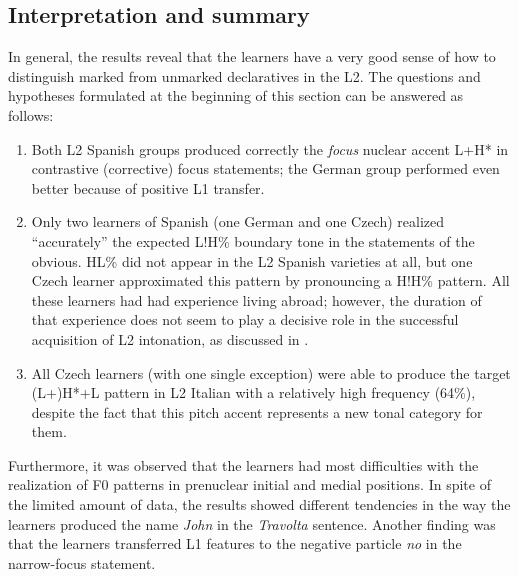 \subsection{Interpretation and summary}\label{sec:4.2.5}

In general, the results reveal that the learners have a very good sense of how to distinguish marked from unmarked declaratives in the L2. The questions and hypotheses formulated at the beginning of this section can be answered as follows:

\begin{enumerate}[label=H\arabic*,font=\PeskovaColonAfterItem]
\item
 Both  L2 Spanish groups produced correctly the \textit{focus}{} nuclear accent L+H* in contrastive (corrective) focus statements; the German group performed even better because of positive L1 transfer.

\item
 Only two learners of Spanish (one German and one Czech) realized “accurately” the expected L!H\% boundary tone in the statements of the obvious. HL\% did not appear in the L2 Spanish varieties at all, but one Czech learner approximated this pattern by pronouncing a H!H\% pattern. All these learners had had experience living abroad; however, the duration of that experience does not seem to play a decisive role in the successful acquisition of L2 intonation, as discussed in \citet{Pešková2022b}.

\item
 All Czech learners (with one single exception) were able to produce the target (L+)H*+L pattern in L2 Italian with a relatively high frequency (64\%), despite the fact that this pitch accent represents a new tonal category for them.

\end{enumerate}

Furthermore, it was observed that the learners had most difficulties with the realization of F0 patterns in prenuclear initial and medial positions. In spite of the limited amount of data, the results showed different tendencies in the way the learners produced the name \textit{John} in the \textit{Travolta}{} sentence. Another finding was that the learners transferred L1 features to the negative particle \textit{no} in the narrow-focus statement.


